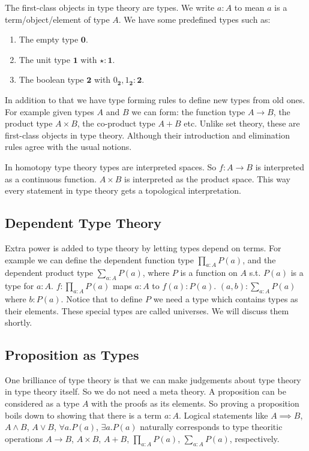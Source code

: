 \documentclass[10pt]{article}
\theoremstyle{definition}
\theoremstyle{plain}
\theoremstyle{remark}
\begin{document}
The first-class objects in type theory are types.  We write $a : A$ to mean $a$ is a 
term/object/element of type $A$. We have some predefined types such as:
\begin{enumerate}
\item The empty type $\mathbf{0}$.
\item The unit type $\mathbf{1}$ with $\star : \mathbf{1}$.
\item The boolean type $\mathbf{2}$ with $0_{\mathbf{2}}, 1_{\mathbf{2}} : \mathbf{2}$.  
\end{enumerate}
In addition to that we have type forming rules to define new types from old ones. For example
given types $A$ and $B$ we can form: the function type $A \to B$, the product type 
$A \times B$, the co-product type $A + B$ etc. Unlike set theory, these are first-class 
objects in type theory. Although their introduction and elimination rules agree with the 
usual notions.\smallskip

In homotopy type theory types are interpreted spaces. So $f : A \to B$ is 
interpreted as a continuous function. $A \times B$ is interpreted as the product space.
This way every statement in type theory gets a topological interpretation.

\subsection{Dependent Type Theory}
Extra power is added to type theory by letting types depend on terms. For example we can 
define the dependent function type $\prod_{a : A} P(a)$, and the dependent product type
$\sum_{a : A} P(a)$, where $P$ is a function on $A$ s.t. $P(a)$ is a type for $a : A$. 
$f : \prod_{a : A} P(a)$ maps $a : A$ to $f(a) : P(a)$. $(a,b) : \sum_{a : A} P(a)$ where
$b : P(a)$. Notice that to define $P$ we need a type which contains types as their elements.
These special types are called universes. We will discuss them shortly. 
 
\subsection{Proposition as Types}
One brilliance of type theory is that we can make judgements about type theory in type theory
itself. So we do not need a meta theory. A proposition can be considered as a type $A$ with 
the proofs as its elements. So proving a proposition boils down to showing that there is a
term $a : A$. Logical statements like $A \implies B$, $A \wedge B$, $A \vee B$, 
$\forall a. P(a)$, $\exists a. P(a)$ naturally corresponds to type theoritic operations 
$A \to B$, $A \times B$, $A + B$, $\prod_{a : A} P(a)$, $\sum_{a : A} P(a)$, 
respectively.\smallskip
\end{document}
